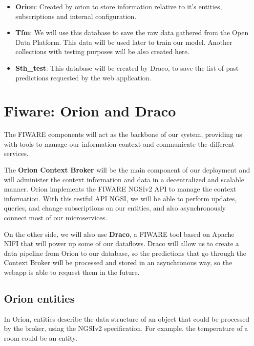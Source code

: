 \begin{itemize}
  \item \textbf{Orion}: Created by orion to store information relative to it's entities, subscriptions and internal configuration.
  \item \textbf{Tfm}: We will use this database to save the raw data gathered from the Open Data Platform. This data will be used later to train our model. Another collections with testing purposes will be also created here.
  \item \textbf{Sth\_test}: This database will be created by Draco, to save the list of past predictions requested by the web application. 
\end{itemize}

\clearpage

\section{Fiware: Orion and Draco}
\label{section:Fiware}

The FIWARE components will act as the backbone of our system, providing us with tools to manage our information context and communicate the different services.

The \textbf{Orion Context Broker} will be the main component of our deployment and will administer the context information and data in a decentralized and scalable manner. Orion implements the  FIWARE NGSIv2 API to manage the context information. With this restful API  NGSI, we will be able to perform updates, queries, and change subscriptions on our entities, and also asynchronously connect most of our microservices.

On the other side, we will also use \textbf{Draco}, a FIWARE tool based on Apache NIFI that will power up some of our dataflows. Draco will allow us to create a data pipeline from Orion to our database, so the predictions that go through the Context Broker will be processed and stored in an asynchronous way, so the webapp is able to request them in the future.


\subsection{Orion entities}

In Orion, entities describe the data structure of an object that could be processed by the broker, using the NGSIv2 specification. For example, the temperature of a room could be an entity. 

